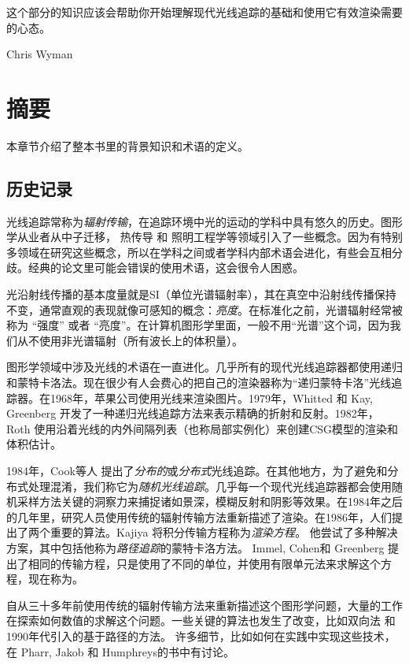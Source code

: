 \documentclass[12pt]{article}
\begin{document}
这个部分的知识应该会帮助你开始理解现代光线追踪的基础和使用它有效渲染需要的心态。

Chris Wyman
 \section{摘要}
 本章节介绍了整本书里的背景知识和术语的定义。
 \subsection{历史记录}
 光线追踪常称为\textit{辐射传输}，在追踪环境中光的运动的学科中具有悠久的历史。图形学从业者从中子迁移\cite{Arvo:1990:PTI:97880.97886}， 热传导\cite{siegel1981thermal} 和 照明工程学\cite{Larson:1998:RRA:286090}等领域引入了一些概念。因为有特别多领域在研究这些概念，所以在学科之间或者学科内部术语会进化，有些会互相分歧。经典的论文里可能会错误的使用术语，这会很令人困惑。
 
 光沿射线传播的基本度量就是SI（单位光谱辐射率），其在真空中沿射线传播保持不变，通常直观的表现就像可感知的概念：\textit{亮度}。在标准化之前，光谱辐射经常被称为 “强度” 或者 “亮度”。在计算机图形学里面，一般不用“光谱”这个词，因为我们从不使用非光谱辐射（所有波长上的体积量）。
 
 图形学领域中涉及光线的术语在一直进化。几乎所有的现代光线追踪器都使用递归和蒙特卡洛法。现在很少有人会费心的把自己的渲染器称为“递归蒙特卡洛”光线追踪器。在1968年，苹果公司\cite{Appel:1968:TSM:1468075.1468082}使用光线来渲染图片。1979年，Whitted \cite{Whitted:1980:IIM:358876.358882} 和 Kay, Greenberg \cite{Kay:1979:TCS:800249.807438}开发了一种递归光线追踪方法来表示精确的折射和反射。1982年，Roth \cite{ROTH1982109} 使用沿着光线的内外间隔列表（也称局部实例化）来创建CSG模型的渲染和体积估计。
 
 1984年，Cook等人\cite{Cook:1984:DRT:964965.808590} 提出了\textit{分布的}或\textit{分布式}光线追踪。在其他地方，为了避免和分布式处理混淆，我们称它为\textit{随机光线追踪}。几乎每一个现代光线追踪器都会使用随机采样方法关键的洞察力来捕捉诸如景深，模糊反射和阴影等效果。在1984年之后的几年里，研究人员使用传统的辐射传输方法重新描述了渲染。在1986年，人们提出了两个重要的算法。Kajiya \cite{Kajiya:1986:RE:15922.15902} 将积分传输方程称为\textit{渲染方程}。 他尝试了多种解决方案，其中包括他称为\textit{路径追踪}的蒙特卡洛方法。 Immel, Cohen和 Greenberg\cite{Immel:1986:RMN:15922.15901} 提出了相同的传输方程，只是使用了不同的单位，并使用有限单元法来求解这个方程，现在称为。
 
 自从三十多年前使用传统的辐射传输方法来重新描述这个图形学问题，大量的工作在探索如何数值的求解这个问题。一些关键的算法也发生了改变，比如双向法\cite{LW1993BPT,10.1007/978-3-642-87825-1_11} 和 1990年代引入的基于路径的方法\cite{Veach:1997:MLT:258734.258775}。
许多细节，比如如何在实践中实现这些技术，在 Pharr, Jakob 和 Humphreys的书\cite{pharr2016physically}中有讨论。
\end{document}
